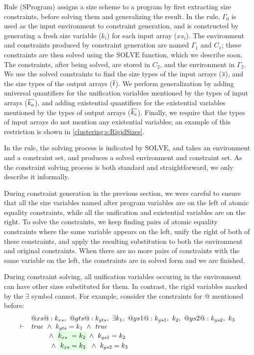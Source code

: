 Rule (SProgram) assigns a size scheme to a program by first extracting size constraints, before solving them and generalizing the result.
In the rule, $\Gamma_0$ is used as the input environment to constraint generation, and is constructed by generating a fresh size variable ($k_i$) for each input array ($xs_i$).
The environment and constraints produced by constraint generation are named $\Gamma_1$ and $C_1$; these constraints are then solved using the $\textrm{SOLVE}$ function, which we describe soon.
The constraints, after being solved, are stored in $C_2$, and the environment in $\Gamma_2$.
We use the solved constraints to find the size types of the input arrays ($\overline{s}$), and the size types of the output arrays ($\overline{t}$).
We perform generalization by adding universal quantifiers for the unification variables mentioned by the types of input arrays ($\overline{k_a}$), and adding existential quantifiers for the existential variables mentioned by the types of output arrays ($\overline{k_e}$).
Finally, we require that the types of input arrays do not mention any existential variables; an example of this restriction is shown in \cref{clustering:s:RigidSizes}.

In the rule, the solving process is indicated by $\textrm{SOLVE}$, and takes an environment and a constraint set, and produces a solved environment and constraint set.
As the constraint solving process is both standard and straightforward, we only describe it informally.

During constraint generation in the previous section, we were careful to ensure that all the size variables named after program variables are on the left of atomic equality constraints, while all the unification and existential variables are on the right.
To solve the constraints, we keep finding pairs of atomic equality constraints where the same variable appears on the left, unify the right of both of these constraints, and apply the resulting substitution to both the environment and original constraints.
When there are no more pairs of constraints with the same variable on the left, the constraints are in solved form and we are finished.

During constraint solving, all unification variables occuring in the environment can have other sizes substituted for them.
In contrast, the rigid variables marked by the $\exists$ symbol cannot.
For example, consider the constraints for @ mentioned before:
$$
\begin{array}{ll}
   & @xs @ : k_{xs},~
@gts@ : k_{gts},~ \exists k_1,~
@ys1@ : k_{ys1},~ k_2,~
@ys2@ : k_{ys2},~ k_3
\\
\vdash & \true 
        ~\wedge~  k_{gts} = k_1 ~\wedge~ \true
\\     &~~~~~~~\; 
          \wedge~  \colorbox{Highlighted}{$k_{xs}  ~= k_2$}
          \wedge~  k_{ys1}  = k_2 
\\     &~~~~~~~\; 
        ~ \wedge~  \colorbox{Highlighted}{$k_{xs}   = k_3$}
        ~ \wedge~  k_{ys2}  = k_3
\end{array}
$$

